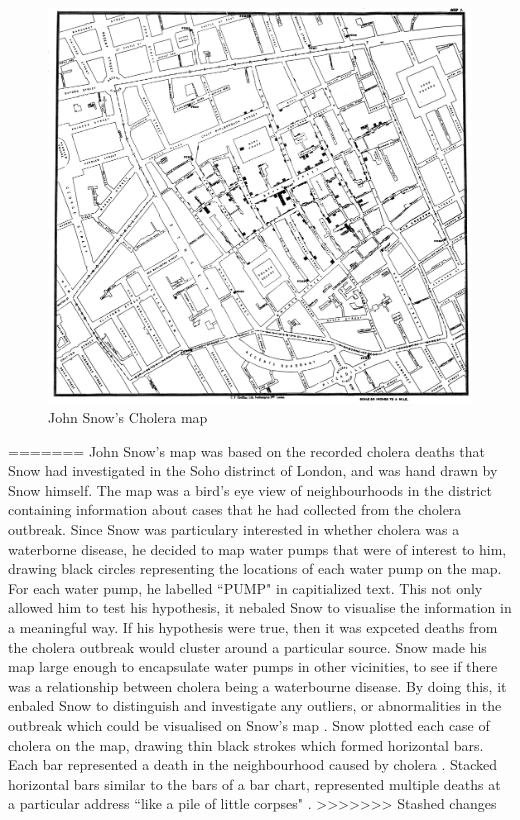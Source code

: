 \documentclass[12pt]{article}
\begin{document}
\begin{figure}
\centering
\includegraphics[scale=0.1]{Snow-cholera-map-1}
\caption{John Snow's Cholera map}
\label{fig:snow}
\end{figure}
=======
John Snow's map was based on the recorded cholera deaths that Snow had investigated in the Soho distrinct of London, and was hand drawn by Snow himself. The map was a bird's eye view of neighbourhoods in the district containing information about cases that he had collected from the cholera outbreak. Since Snow was particulary interested in whether cholera was a waterborne disease, he decided to map water pumps that were of interest to him, drawing black circles representing the locations of each water pump on the map. For each water pump, he labelled ``PUMP" in capitialized text. This not only allowed him to test his hypothesis, it nebaled Snow to visualise the information in a meaningful way. If his hypothesis were true, then it was expceted deaths from the cholera outbreak would cluster around a particular source. Snow made his map large enough to encapsulate water pumps in other vicinities, to see if there was a relationship between cholera being a waterbourne disease. By doing this, it enbaled Snow to distinguish and investigate any outliers, or abnormalities in the outbreak which could be visualised on Snow's map \cite{blog}. Snow plotted each case of cholera on the map, drawing thin black strokes which formed horizontal bars. Each bar represented a death in the neighbourhood caused by cholera \cite{tedtalk}. Stacked horizontal bars similar to the bars of a bar chart, represented multiple deaths at a particular address ``like a pile of little corpses" \cite{blog}.
>>>>>>> Stashed changes
\end{document}
